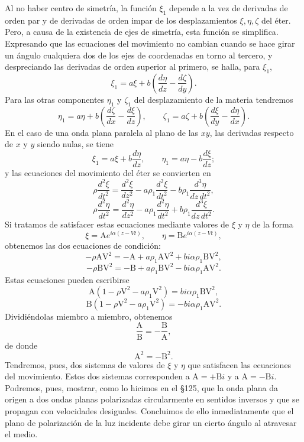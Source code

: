 Al no haber centro de simetría, la función $\xi_1$ depende a la vez de
derivadas de orden par y de derivadas de orden impar de los desplazamientos
$\xi,\eta,\zeta$ del éter. Pero, a causa de la existencia de ejes de
simetría, esta función se simplifica. Expresando que las ecuaciones del
movimiento no cambian cuando se hace girar un ángulo cualquiera dos de los
ejes de coordenadas en torno al tercero, y despreciando las derivadas de
orden superior al primero, se halla, para $\xi_1$,
\[
\xi_1=a\xi+b\left(\frac{d\eta}{dz}-\frac{d\zeta}{dy}\right).
\]
Para las otras componentes $\eta_1$ y $\zeta_1$ del desplazamiento de la
materia tendremos
\[
\eta_1=a\eta+b\left(\frac{d\zeta}{dx}-\frac{d\xi}{dz}\right),\qquad
\zeta_1=a\zeta+b\left(\frac{d\xi}{dy}-\frac{d\eta}{dx}\right).
\]
En el caso de una onda plana paralela al plano de las $xy$, las derivadas
respecto de $x$ y $y$ siendo nulas, se tiene
\[
\xi_1=a\xi+b\frac{d\eta}{dz},\qquad \eta_1=a\eta-b\frac{d\xi}{dz};
\]
y las ecuaciones del movimiento del éter se convierten en
\[
\rho\frac{d^2\xi}{dt^2}=\frac{d^2\xi}{dz^2}-a\rho_1\frac{d^2\xi}{dt^2}
-b\rho_1\frac{d^3\eta}{dz\,dt^2},
\]
\[
\rho\frac{d^2\eta}{dt^2}=\frac{d^2\eta}{dz^2}-a\rho_1\frac{d^2\eta}{dt^2}
+b\rho_1\frac{d^3\xi}{dz\,dt^2}.
\]
Si tratamos de satisfacer estas ecuaciones mediante valores de $\xi$ y
$\eta$ de la forma
\[
\xi=\mathrm Ae^{i\alpha(z-Vt)},\qquad \eta=\mathrm Be^{i\alpha(z-Vt)},
\]
obtenemos las dos ecuaciones de condición:
\[
-\rho\mathrm A\mathrm V^2=-\mathrm A+a\rho_1\mathrm A\mathrm V^2
+bi\alpha\rho_1\mathrm B\mathrm V^2,
\]
\[
-\rho\mathrm B\mathrm V^2=-\mathrm B+a\rho_1\mathrm B\mathrm V^2
-bi\alpha\rho_1\mathrm A\mathrm V^2.
\]
Estas ecuaciones pueden escribirse
\[
\mathrm A(1-\rho\mathrm V^2-a\rho_1\mathrm V^2)=bi\alpha\rho_1\mathrm B\mathrm V^2,
\]
\[
\mathrm B(1-\rho\mathrm V^2-a\rho_1\mathrm V^2)=-bi\alpha\rho_1\mathrm A\mathrm V^2.
\]
Dividiéndolas miembro a miembro, obtenemos
\[
\frac{\mathrm A}{\mathrm B}=-\frac{\mathrm B}{\mathrm A},
\]
de donde
\[
\mathrm A^2=-\mathrm B^2.
\]
Tendremos, pues, dos sistemas de valores de $\xi$ y $\eta$ que satisfacen
las ecuaciones del movimiento. Estos dos sistemas corresponden a
$\mathrm A=+\mathrm Bi$ y a $\mathrm A=-\mathrm Bi$. Podremos, pues, mostrar,
como lo hicimos en el §125, que la onda plana da origen a dos ondas planas
polarizadas circularmente en sentidos inversos y que se propagan con
velocidades desiguales. Concluimos de ello inmediatamente que el plano de
polarización de la luz incidente debe girar un cierto ángulo al atravesar
el medio.
